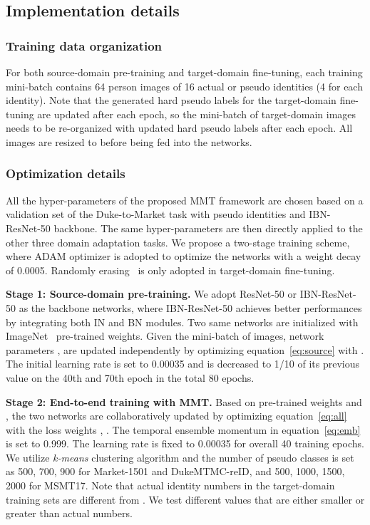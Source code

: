\documentclass{article} \usepackage{iclr2020_conference,times}
\def\eqref#1{equation~\ref{#1}}
\begin{document}
\subsection{Implementation details}
\vspace{-5pt}


\subsubsection{Training data organization}
\label{sec:data}
\vspace{-5pt}
For both source-domain pre-training and target-domain fine-tuning, each training mini-batch contains 64 person images of 16 actual or pseudo identities (4 for each identity).
Note that the generated hard pseudo labels for the target-domain fine-tuning are updated after each epoch, so the mini-batch of target-domain images needs to be re-organized with updated hard pseudo labels after each epoch.
All images are resized to  before being fed into the networks. 
\subsubsection{Optimization details}
\label{sec:details}
\vspace{-5pt}
All the hyper-parameters of the proposed MMT framework are chosen based on a validation set of the
Duke-to-Market task with  pseudo identities and IBN-ResNet-50 backbone. The same hyper-parameters are then directly applied to the other three domain adaptation tasks.
We propose a two-stage training scheme, where ADAM optimizer is adopted to optimize the networks with a weight decay of 0.0005.
Randomly erasing~\citep{zhong2017random} is only adopted in target-domain fine-tuning.

\noindent\textbf{Stage 1: Source-domain pre-training.}
We adopt ResNet-50 \citep{he2016deep} or IBN-ResNet-50 \citep{pan2018two} as the backbone networks,
where
IBN-ResNet-50 achieves better performances by integrating both IN and BN modules.
Two same networks are initialized with ImageNet~\citep{deng2009imagenet} pre-trained weights.
Given the mini-batch of images, network parameters ,  are updated independently by optimizing \eqref{eq:source} with . 
The initial learning rate is set to 0.00035 and is decreased to 1/10 of its previous value on the 40th and 70th epoch in the total 80 epochs. 

\noindent\textbf{Stage 2: End-to-end training with MMT.}
Based on pre-trained weights  and ,
the two networks are collaboratively updated by optimizing \eqref{eq:all} with the loss weights , .
The temporal ensemble momentum  in \eqref{eq:emb} is set to 0.999.
The learning rate is fixed to 0.00035 for overall 40 training epochs.
We utilize \textit{k-means} clustering algorithm and the number  of pseudo classes is set as 500, 700, 900 for Market-1501 and DukeMTMC-reID, and 500, 1000, 1500, 2000 for MSMT17. 
Note that actual identity numbers in the target-domain training sets are different from . We test different  values that are either smaller or greater than actual numbers.
\end{document}

